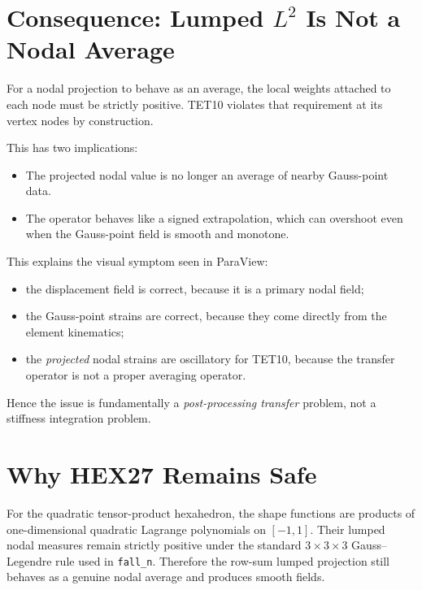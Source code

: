\section{Consequence: Lumped \texorpdfstring{$L^2$}{L2} Is Not a Nodal Average}
\label{sec:adaptive_not_average}

For a nodal projection to behave as an average, the local weights attached to
each node must be strictly positive.  TET10 violates that requirement at its
vertex nodes by construction.

This has two implications:
\begin{itemize}[nosep]
  \item The projected nodal value is no longer an average of nearby Gauss-point
        data.
  \item The operator behaves like a signed extrapolation, which can overshoot
        even when the Gauss-point field is smooth and monotone.
\end{itemize}

This explains the visual symptom seen in ParaView:
\begin{itemize}[nosep]
  \item the displacement field is correct, because it is a primary nodal field;
  \item the Gauss-point strains are correct, because they come directly from
        the element kinematics;
  \item the \emph{projected} nodal strains are oscillatory for TET10, because
        the transfer operator is not a proper averaging operator.
\end{itemize}

Hence the issue is fundamentally a \emph{post-processing transfer} problem,
not a stiffness integration problem.


\section{Why HEX27 Remains Safe}
\label{sec:adaptive_hex27}

For the quadratic tensor-product hexahedron, the shape functions are products
of one-dimensional quadratic Lagrange polynomials on $[-1,1]$.  Their lumped
nodal measures remain strictly positive under the standard
$3\times3\times3$ Gauss--Legendre rule used in \texttt{fall\_n}.  Therefore
the row-sum lumped projection still behaves as a genuine nodal average and
produces smooth fields.


